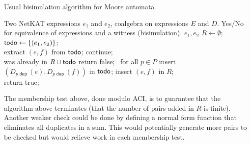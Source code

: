 \documentclass{article}
\newcommand\pdup{\mathop{\mathsf{dup}}}
\begin{document}
\begin{algorithm}
  \caption{Usual bisimulation algorithm for Moore automata
    \label{alg:Moore_naive}}
  \begin{algorithmic}[1]
  \Require Two NetKAT expressions $e_1$ and $e_2$, coalgebra on expressions $E$ and $D$.
  \Ensure Yes/No for equivalence of expressions and a witness (bisimulation).
 {$e_1,e_2$}
\State $R \gets \emptyset$; $\textsf{todo} \gets \{(e_1,e_2)\}$;\\
     \State extract $(e,f)$ from $\textsf{todo}$;
       continue; \\
     {\footnotesize  \hfill was already in $R\cup \textsf{todo}$}
      \Else {} return false; 
      \Else\ for all { $p\in P$} 
       \State  insert $(D_{p\pdup}(e),D_{p\pdup}(f))$ in $\textsf{todo}$;
       \EndIf
       \EndIf
\State insert $(e,f)$ in $R$; \\
return true;
\EndFunction
\end{algorithmic}
\end{algorithm}

\begin{remark}
The membership test above, done modulo ACI, is to guarantee that the algorithm above terminates (that the number of pairs added in $R$ is finite). Another weaker check could be done by defining a normal form function that eliminates all duplicates in a sum. This would potentially generate more pairs to be checked but would relieve work in each membership test. 
\end{remark}
\end{document}

